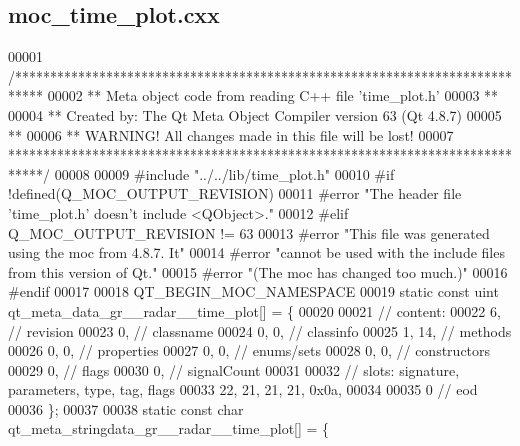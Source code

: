 \subsection{moc\+\_\+time\+\_\+plot.\+cxx}
\label{moc__time__plot_8cxx_source}

\begin{DoxyCode}
00001 \textcolor{comment}{/****************************************************************************}
00002 \textcolor{comment}{** Meta object code from reading C++ file 'time\_plot.h'}
00003 \textcolor{comment}{**}
00004 \textcolor{comment}{** Created by: The Qt Meta Object Compiler version 63 (Qt 4.8.7)}
00005 \textcolor{comment}{**}
00006 \textcolor{comment}{** WARNING! All changes made in this file will be lost!}
00007 \textcolor{comment}{*****************************************************************************/}
00008 
00009 \textcolor{preprocessor}{#include "../../lib/time\_plot.h"}
00010 \textcolor{preprocessor}{#if !defined(Q\_MOC\_OUTPUT\_REVISION)}
00011 \textcolor{preprocessor}{#error "The header file 'time\_plot.h' doesn't include <QObject>."}
00012 \textcolor{preprocessor}{#elif Q\_MOC\_OUTPUT\_REVISION != 63}
00013 \textcolor{preprocessor}{#error "This file was generated using the moc from 4.8.7. It"}
00014 \textcolor{preprocessor}{#error "cannot be used with the include files from this version of Qt."}
00015 \textcolor{preprocessor}{#error "(The moc has changed too much.)"}
00016 \textcolor{preprocessor}{#endif}
00017 
00018 QT\_BEGIN\_MOC\_NAMESPACE
00019 \textcolor{keyword}{static} \textcolor{keyword}{const} uint qt_meta_data_gr__radar__time_plot[] = \{
00020 
00021  \textcolor{comment}{// content:}
00022        6,       \textcolor{comment}{// revision}
00023        0,       \textcolor{comment}{// classname}
00024        0,    0, \textcolor{comment}{// classinfo}
00025        1,   14, \textcolor{comment}{// methods}
00026        0,    0, \textcolor{comment}{// properties}
00027        0,    0, \textcolor{comment}{// enums/sets}
00028        0,    0, \textcolor{comment}{// constructors}
00029        0,       \textcolor{comment}{// flags}
00030        0,       \textcolor{comment}{// signalCount}
00031 
00032  \textcolor{comment}{// slots: signature, parameters, type, tag, flags}
00033       22,   21,   21,   21, 0x0a,
00034 
00035        0        \textcolor{comment}{// eod}
00036 \};
00037 
00038 \textcolor{keyword}{static} \textcolor{keyword}{const} \textcolor{keywordtype}{char} qt_meta_stringdata_gr__radar__time_plot[] = \{

\end{DoxyCode}

